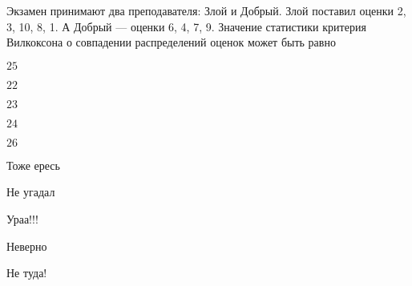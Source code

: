 
\begin{question}
Экзамен принимают два преподавателя: Злой и Добрый. Злой поставил оценки
2, 3, 10, 8, 1. А Добрый — оценки 6, 4, 7, 9. Значение статистики
критерия Вилкоксона о совпадении распределений оценок может быть равно
\begin{answerlist}
  \item \(25\)
  \item \(22\)
  \item \(23\)
  \item \(24\)
  \item \(26\)
\end{answerlist}
\end{question}

\begin{solution}
\begin{answerlist}
  \item Тоже ересь
  \item Не угадал
  \item Ураа!!!
  \item Неверно
  \item Не туда!
\end{answerlist}
\end{solution}

